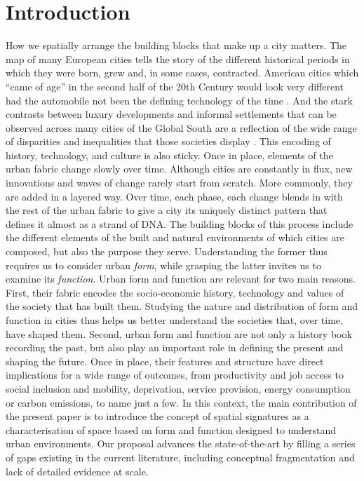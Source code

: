 \section{Introduction}
\label{sec:intro}

How we spatially arrange the building blocks that make up a city matters.
%
The map of many European cities tells the story of the different historical
periods in which they were born, grew and, in some cases, contracted.
%
American cities which ``came of age'' in the second half of the 20th Century
would look very different had the automobile not been the defining
technology of the time \citep{jacobs2016death}.
%
And the stark contrasts between luxury developments and informal settlements
that can be observed across many cities of the Global South are a reflection
of the wide range of disparities and inequalities that those societies
display \citep{alsayyad2003urban}.
%
This encoding of history, technology, and culture is also sticky. Once in place,
elements of the urban fabric change slowly over time. Although cities are constantly in flux, new
innovations and waves of change rarely start from scratch. More commonly, they
are added in a layered way. Over time, each phase, each change blends in with the rest
of the urban fabric to give a city its uniquely distinct pattern that defines
it almost as a strand of DNA.
The building blocks of this process include the different
elements of the built and natural environments of which cities are composed,
but also the purpose they serve.
Understanding the former thus requires us to consider urban \textit{form}, while
grasping the latter invites us to examine its \textit{function}.
Urban form and function are relevant for two main reasons. First, their fabric
encodes the socio-economic history, technology and values
of the society that has built them.
%
Studying the nature and distribution
of form and function in cities thus helps us better understand the societies
that, over time, have shaped them.
Second, urban form and function are
not only a history book recording the past, but also play an important role in
defining the present and shaping the future.
%
Once in place, their features and structure have direct implications for a
wide range of outcomes, from productivity and job access to social inclusion
and mobility, deprivation, service provision, energy consumption or carbon
emissions, to name just a few.
% 
In this context, the main contribution of the present paper is to
introduce the concept of spatial signatures as a characterisation of
space based on form and function designed to understand urban environments.
Our proposal advances the state-of-the-art by filling a series of gaps existing in the
current literature, including conceptual fragmentation and lack of detailed
evidence at scale.

